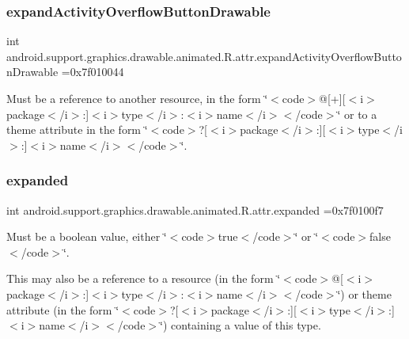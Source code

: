 \subsubsection{\texorpdfstring{expand\+Activity\+Overflow\+Button\+Drawable}{expandActivityOverflowButtonDrawable}}
{\footnotesize\ttfamily int android.\+support.\+graphics.\+drawable.\+animated.\+R.\+attr.\+expand\+Activity\+Overflow\+Button\+Drawable =0x7f010044\hspace{0.3cm}{\ttfamily [static]}}

Must be a reference to another resource, in the form \char`\"{}$<$code$>$@\mbox{[}+\mbox{]}\mbox{[}$<$i$>$package$<$/i$>$\+:\mbox{]}$<$i$>$type$<$/i$>$\+:$<$i$>$name$<$/i$>$$<$/code$>$\char`\"{} or to a theme attribute in the form \char`\"{}$<$code$>$?\mbox{[}$<$i$>$package$<$/i$>$\+:\mbox{]}\mbox{[}$<$i$>$type$<$/i$>$\+:\mbox{]}$<$i$>$name$<$/i$>$$<$/code$>$\char`\"{}. \mbox{\label{classandroid_1_1support_1_1graphics_1_1drawable_1_1animated_1_1R_1_1attr_a58b977313330837ff0ba4d94a60957f6}} 
\subsubsection{\texorpdfstring{expanded}{expanded}}
{\footnotesize\ttfamily int android.\+support.\+graphics.\+drawable.\+animated.\+R.\+attr.\+expanded =0x7f0100f7\hspace{0.3cm}{\ttfamily [static]}}

Must be a boolean value, either \char`\"{}$<$code$>$true$<$/code$>$\char`\"{} or \char`\"{}$<$code$>$false$<$/code$>$\char`\"{}. 

This may also be a reference to a resource (in the form \char`\"{}$<$code$>$@\mbox{[}$<$i$>$package$<$/i$>$\+:\mbox{]}$<$i$>$type$<$/i$>$\+:$<$i$>$name$<$/i$>$$<$/code$>$\char`\"{}) or theme attribute (in the form \char`\"{}$<$code$>$?\mbox{[}$<$i$>$package$<$/i$>$\+:\mbox{]}\mbox{[}$<$i$>$type$<$/i$>$\+:\mbox{]}$<$i$>$name$<$/i$>$$<$/code$>$\char`\"{}) containing a value of this type. \mbox{\label{classandroid_1_1support_1_1graphics_1_1drawable_1_1animated_1_1R_1_1attr_a793864cc2e24fc0e898ea236809e9569}} 
